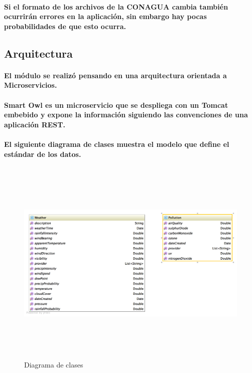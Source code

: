     \paragraph{Si el formato de los archivos de la CONAGUA cambia también ocurrirán errores en la aplicación, sin embargo hay pocas probabilidades de que esto ocurra.}

  \subsection{Arquitectura}
    \paragraph{El módulo se realizó pensando en una arquitectura orientada a Microservicios.}
    \paragraph{Smart Owl es un microservicio que se despliega con un Tomcat embebido y expone la información siguiendo las convenciones de una aplicación REST.}

    \paragraph{El siguiente diagrama de clases muestra el modelo que define el estándar de los datos.}
    \begin{figure}[b!]
      \begin{center}
        \includegraphics[width=14cm,height=10cm]{./images/SmartOwl_ClassDiagram}
        \caption{Diagrama de clases}
      \end{center}
    \end{figure}
